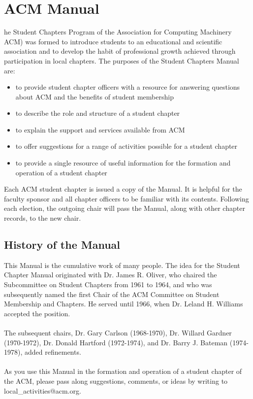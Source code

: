 %
%
\let\textcircled=\pgftextcircled
\chapter{ACM Manual}
\label{chap:manual}

he Student Chapters Program of the Association for Computing Machinery
ACM) was formed to introduce students to an educational and scientific association
and to develop the habit of professional growth achieved through participation
in local chapters. The purposes of the Student Chapters Manual are:
  \begin{itemize}
    \item to provide student chapter officers with a resource for answering
          questions about ACM and the benefits of student membership
    \item to describe the role and structure of a student chapter
    \item to explain the support and services available from ACM
    \item to offer suggestions for a range of activities possible for a student
          chapter
    \item to provide a single resource of useful information for the formation
          and operation of a student chapter
  \end{itemize}

Each ACM student chapter is issued a copy of the Manual. It is helpful for the
faculty sponsor and all chapter officers to be familiar with its contents.
Following each election, the outgoing chair will pass the Manual, along with
other chapter records, to the new chair.

\section{History of the Manual}
\label{sec:sec01}

This Manual is the cumulative work of many people. The idea for the Student
Chapter Manual originated with Dr. James R. Oliver, who chaired the Subcommittee
on Student Chapters from 1961 to 1964, and who was subsequently named the first
Chair of the ACM Committee on Student Membership and Chapters. He served until
1966, when Dr. Leland H. Williams accepted the position.
\\
\\
The subsequent chairs, Dr. Gary Carlson (1968-1970), Dr. Willard Gardner
(1970-1972), Dr. Donald Hartford (1972-1974), and Dr. Barry J. Bateman
(1974-1978), added refinements.
\\
\\
As you use this Manual in the formation and operation of a student chapter of
the ACM, please pass along suggestions, comments, or ideas by writing to
local\_activities@acm.org.

